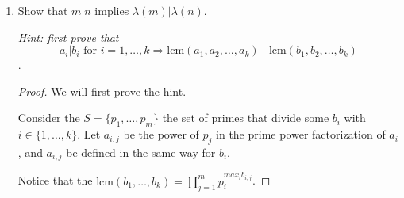\documentclass[12pt]{article}
\begin{document}
\begin{enumerate}
    \begin{proof}
    Let us recall that if $n = p_1^{a_1}p_2^{a_2} \ldots p_k^{a_k}$ is the prime power factorization of $n$, then $\varphi(n) = n \displaystyle \left(1- \frac{1}{p_1}\right) \ldots \left(1- \frac{1}{p_k}\right)$.
    
    Let $p_1, \ldots , p_r$ be the prime divisors of $m$ that don't divide $n$, $q_1, \ldots, q_s$  the prime divisors of $n$ that don't divide $m$, and $r_1, \ldots, r_t$, the common prime divisors of $m$ and $n$.
    
    Let $$P := \displaystyle\prod\limits_{i=1}^{r}\left( 1- \frac{1}{p_i}\right)$$
    $$Q := \displaystyle\prod\limits_{i=1}^{s}\left( 1- \frac{1}{q_i}\right)$$
    $$R := \displaystyle\prod\limits_{i=1}^{t}\left( 1- \frac{1}{r_i}\right)$$
    
    It follows that $\varphi (m) = m \cdot P \cdot R$, $\varphi(n) = n \cdot Q \cdot R$, and $\varphi (m\cdot n) = m \cdot n \cdot P \cdot Q \cdot R = \displaystyle\frac{m \cdot Q \cdot R \cdot n \cdot Q \cdot R}{R} = \displaystyle\frac{\varphi(m) \cdot \varphi(n)}{R}$.
    
    Since $\textrm{gcd}(m,n)$ is a common divisor, then the prime power factorization of $\textrm{gcd}(m,n)$ is given by $r_1,\ldots, r_t$. it follows that $\varphi(\textrm{gcd}(m,n))= \textrm{gcd}(m,n) \cdot R$. Therefore $R = \displaystyle\frac{ \varphi( \textrm{gcd}(m,n))}{\textrm{gcd}(m,n)}$
    
    Therefore $\varphi(m \cdot n ) = \varphi(m) \cdot \varphi(n) \cdot \displaystyle\frac{\textrm{gcd}(m,n)}{\varphi(\textrm{gcd}(m,n))}$.
    \end{proof}
    
    \item Show that $m|n$ implies $\lambda(m) | \lambda (n)$.
    
    \emph{Hint: first prove that}
    $$a_i | b_i \textrm{ for } i = 1, \ldots,k \Longrightarrow \textrm{lcm} (a_1,a_2, \ldots, a_k)\; | \textrm{ lcm}(b_1, b_2, \ldots,b_k) $$.
    
    \begin{proof}
        We will first prove the hint.
        
        Consider the $S = \{p_1, \ldots , p_m\}$ the set of primes that divide some $b_i$ with $i \in \{1,\ldots,k\}$. Let $a_{i,j}$ be the power of $p_j$ in the prime power factorization of $a_i$, and $a_{i,j}$ be defined in the same way for $b_i$.
        
        Notice that the $\textrm{lcm}(b_1, \ldots, b_k) = \displaystyle\prod \limits_{j=1}^{m} p_i^{max_{i}{b_{i,j}}}$.
        

\end{proof}
\end{enumerate}
\end{document}
